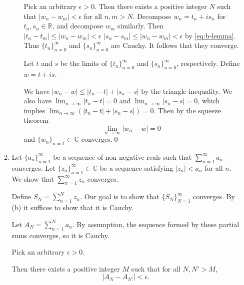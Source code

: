 \documentclass[oneside]{article}
\newcommand\abs[1]{\left|#1\right|}
\newcommand\bbC{\mathbb{C}}
\newcommand\bbR{\mathbb{R}}
\begin{document}
\begin{enumerate}[label=\textbf{\arabic*.}]
\begin{enumerate}[label=\textbf{(\alph*)}]
\begin{itemize}[leftmargin=34pt]
        Pick an arbitrary $\epsilon > 0$. Then there exists a positive integer
        $N$ such that $\abs{w_n - w_m} < \epsilon$ for all $n, m > N$. Decompose
        $w_n = t_n + is_n$ for $t_n, s_n \in \bbR$, and decompose $w_m$
        similarly. Then $\abs{t_n - t_m} \leq \abs{w_n - w_m} < \epsilon$
        $\abs{s_n - s_m} \leq \abs{w_n - w_m} < \epsilon$ by \eqref{eq:b-lemma}.
        Thus $\{t_n\}_{n=0}^\infty$ and $\{s_n\}_{n=0}^\infty$ are Cauchy. It
        follows that they converge.

        Let $t$ and $s$ be the limits of $\{t_n\}_{n=0}^\infty$ and
        $\{s_n\}_{n=0}^\infty$, respectively. Define $w = t + is$.

        We have $\abs{w_n - w} \leq \abs{t_n - t} + \abs{s_n - s}$ by the
        triangle inequality. We also have $\lim_{n\to\infty}\abs{t_n - t} = 0$
        and $\lim_{n\to\infty}\abs{s_n - s} = 0$, which implies
        $\lim_{n\to\infty}(\abs{t_n - t} + \abs{s_n - s}) = 0$. Then by the
        squeeze theorem
        \[
          \lim_{n\to\infty}\abs{w_n - w} = 0
        \] and $\{w_n\}_{n=1} \subset \bbC$ converges.\qed
    \end{itemize}

    \item Let $\{a_n\}_{n=1}^\infty$ be a sequence of non-negative reals such
      that $\sum_{n=1}^\infty a_n$ converges. Let
      $\{z_n\}_{n=1}^\infty \subset \bbC$ be a sequence satisfying
      $\abs{z_n} < a_n$ for all $n$. We show that $\sum_{n=1}^\infty z_n$
      converges.

      Define $S_N = \sum_{n=1}^N z_n$. Our goal is to show that
      $\{S_N\}_{N=1}^\infty$ converges. By (b) it suffices to show that it is
      Cauchy.

      Let $A_N = \sum_{n=1}^N a_n$. By assumption, the sequence formed by these
      partial sums converges, so it is Cauchy.

      Pick an arbitrary $\epsilon > 0$.

      Then there exists a positive integer $M$ such that for all $N, N' > M$,\[
        \abs{A_N - A_{N'}} < \epsilon\text{.}
      \]


\end{enumerate}
\end{enumerate}
\end{document}
